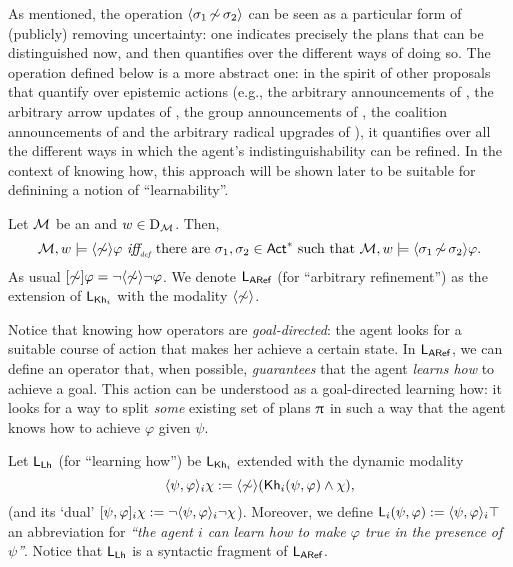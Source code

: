 As mentioned, the operation $\langle \sigma_1{\,\not\sim\,}\sigma_2 \rangle$ can be seen as a particular form of (publicly) removing uncertainty: one indicates precisely the plans that can be distinguished now, and then quantifies over the different ways of doing so. The operation defined below is a more abstract one: in the spirit of other proposals that quantify over epistemic actions (e.g., the arbitrary announcements of \cite{BalbianiBDHHL08}, the arbitrary arrow updates of \cite{DitmarschHKK17}, the group announcements of \cite{GroupAJ}, the coalition announcements of \cite{AgotnesD08} and the arbitrary radical upgrades of \cite{FI24}), it quantifies over all the different ways in which the agent's indistinguishability can be refined. In the context of knowing how, this approach will be shown later to be suitable for definining a notion of ``learnability''.

\medskip

\begin{definition}\label{def:sem:aref}
Let $\mathcal{M}$ be an \ults and $w\in\operatorname{D}_{\mathcal{M}}$.  %
Then,
\[
\modults,w\models\arefdiam\varphi\ \iffdef \ \text{there are } \plan_1,\plan_2 \in \ACT^* \text{ such that } 
\modults,w \models \refdiam{\plan_1}{\plan_2}\varphi.
\]
As usual $[\not\sim]\varphi = \neg\langle \not\sim \rangle\neg\varphi$. We denote $\mathsf{L_{ARef}}$ (for ``arbitrary refinement'') as the extension of $\mathsf{L}_{{\sf Kh}_i}$ with the modality $\langle \not\sim \rangle$.
\end{definition}

\medskip

Notice that knowing how operators are \emph{goal-directed}: the agent looks for a suitable course of action that makes her achieve a certain state. 
In $\mathsf{L_{ARef}}$, we can define an operator that, when possible, \emph{guarantees} that the agent \emph{learns how} to achieve a goal.
This action can be understood as a goal-directed learning how: it looks for a way to split \emph{some} existing set of plans $\uppi$ in such a way that the agent knows how to achieve $\varphi$ given $\psi$. 

\medskip 

Let $\mathsf{L_{Lh}}$ (for ``learning how'') be $\mathsf{L}_{{\sf Kh}_i}$ extended with the dynamic modality
\[
\langle \psi,\varphi \rangle_i\chi := \langle \not\sim \rangle({\sf Kh}_i(\psi,\varphi) \wedge\chi),
\]
(and its `dual' $[\psi,\varphi]_i\chi := \neg\langle \psi,\varphi \rangle_i\neg\chi$).
Moreover, we define ${\sf L}_i(\psi,\varphi) := \langle \psi,\varphi \rangle_i\top$ an abbreviation for \emph{``the agent $i$ can learn how to make $\varphi$ true in the presence of $\psi$''}.
Notice that $\mathsf{L_{Lh}}$ is a syntactic fragment of $\mathsf{L_{ARef}}$.

